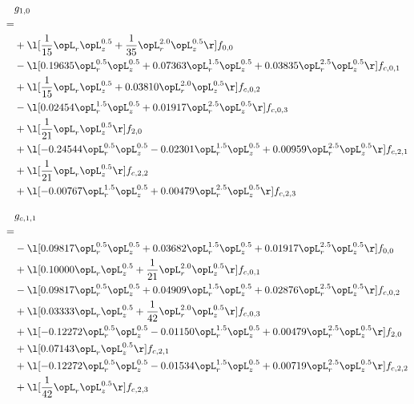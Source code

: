\begin{alignat}{2} 
\label{eq:g_10_0} 
& g_{1,0} \nonumber \\ 
 = \\ 
& + \l[ \frac{1}{15} \opL_r \opL_z^{0.5} + \frac{1}{35} \opL_r^{2.0} \opL_z^{0.5}  \r] f_{0,0} \nonumber \\ 
& - \l[  0.19635 \opL_r^{0.5} \opL_z^{0.5} +  0.07363 \opL_r^{1.5} \opL_z^{0.5} +  0.03835 \opL_r^{2.5} \opL_z^{0.5}  \r] f_{c,0,1} \nonumber \\ 
& + \l[ \frac{1}{15} \opL_r \opL_z^{0.5} +  0.03810 \opL_r^{2.0} \opL_z^{0.5}  \r] f_{c,0,2} \nonumber \\ 
& - \l[  0.02454 \opL_r^{1.5} \opL_z^{0.5} +  0.01917 \opL_r^{2.5} \opL_z^{0.5}  \r] f_{c,0,3} \nonumber \\ 
& + \l[ \frac{1}{21} \opL_r \opL_z^{0.5}  \r] f_{2,0} \nonumber \\ 
& + \l[  -0.24544 \opL_r^{0.5} \opL_z^{0.5}   -0.02301 \opL_r^{1.5} \opL_z^{0.5} +  0.00959 \opL_r^{2.5} \opL_z^{0.5}  \r] f_{c,2,1} \nonumber \\ 
& + \l[ \frac{1}{21} \opL_r \opL_z^{0.5}  \r] f_{c,2,2} \nonumber \\ 
& + \l[  -0.00767 \opL_r^{1.5} \opL_z^{0.5} +  0.00479 \opL_r^{2.5} \opL_z^{0.5}  \r] f_{c,2,3} \nonumber \\ 
\end{alignat} 


\begin{alignat}{2} 
\label{eq:g_11_0} 
& g_{c,1,1} \nonumber \\ 
 = \\ 
& - \l[  0.09817 \opL_r^{0.5} \opL_z^{0.5} +  0.03682 \opL_r^{1.5} \opL_z^{0.5} +  0.01917 \opL_r^{2.5} \opL_z^{0.5}  \r] f_{0,0} \nonumber \\ 
& + \l[  0.10000 \opL_r \opL_z^{0.5} + \frac{1}{21} \opL_r^{2.0} \opL_z^{0.5}  \r] f_{c,0,1} \nonumber \\ 
& - \l[  0.09817 \opL_r^{0.5} \opL_z^{0.5} +  0.04909 \opL_r^{1.5} \opL_z^{0.5} +  0.02876 \opL_r^{2.5} \opL_z^{0.5}  \r] f_{c,0,2} \nonumber \\ 
& + \l[  0.03333 \opL_r \opL_z^{0.5} + \frac{1}{42} \opL_r^{2.0} \opL_z^{0.5}  \r] f_{c,0,3} \nonumber \\ 
& + \l[  -0.12272 \opL_r^{0.5} \opL_z^{0.5}   -0.01150 \opL_r^{1.5} \opL_z^{0.5} +  0.00479 \opL_r^{2.5} \opL_z^{0.5}  \r] f_{2,0} \nonumber \\ 
& + \l[  0.07143 \opL_r \opL_z^{0.5}  \r] f_{c,2,1} \nonumber \\ 
& + \l[  -0.12272 \opL_r^{0.5} \opL_z^{0.5}   -0.01534 \opL_r^{1.5} \opL_z^{0.5} +  0.00719 \opL_r^{2.5} \opL_z^{0.5}  \r] f_{c,2,2} \nonumber \\ 
& + \l[ \frac{1}{42} \opL_r \opL_z^{0.5}  \r] f_{c,2,3} \nonumber \\ 
\end{alignat} 


